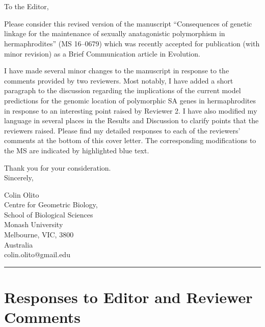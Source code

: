 \documentclass[11pt]{article}
\begin{document}




\section*{}
\noindent To the Editor,
\bigskip

Please consider this revised version of the manuscript “Consequences of genetic linkage for the maintenance of sexually anatagonistic polymorphism in hermaphrodites” (MS 16--0679) which was recently accepted for publication (with minor revision) as a Brief Communication article in Evolution.
\bigskip

I have made several minor changes to the manuscript in response to the comments provided by two reviewers. Most notably, I have added a short paragraph to the discussion regarding the implications of the current model predictions for the genomic location of polymorphic SA genes in hermaphrodites in response to an interesting point raised by Reviewer 2. I have also modified my language in several places in the Results and Discussion to clarify points that the reviewers raised. Please find my detailed responses to each of the reviewers' comments at the bottom of this cover letter. The corresponding modifications to the MS are indicated by highlighted blue text.
\bigskip

\noindent Thank you for your consideration. \\
\noindent Sincerely,
\bigskip

\noindent Colin Olito \\
\noindent Centre for Geometric Biology, \\
\noindent School of Biological Sciences \\
\noindent Monash University \\
\noindent Melbourne, VIC, 3800 \\
\noindent Australia \\
\noindent colin.olito@gmail.edu \\
	
\bigskip
\noindent \rule{\textwidth}{0.4pt}
\bigskip

\newpage{}

\section*{Responses to Editor and Reviewer Comments}
\end{document}
